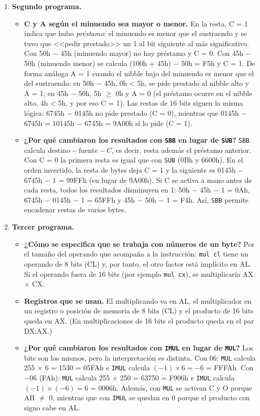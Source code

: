 \documentclass[10pt]{article}
\begin{document}
\begin{enumerate}
  \item \textbf{Segundo programa.}
  \begin{itemize}
    \item \textbf{C y A según el minuendo sea mayor o menor.} En la resta, C = 1 indica que hubo \emph{préstamo}: el minuendo es menor que el sustraendo y se tuvo que <<pedir prestado>> un 1 al bit siguiente al más significativo. Con 50h $-$ 45h (minuendo mayor) no hay préstamo y C = 0. Con 45h $-$ 50h (minuendo menor) se calcula (100h + 45h) $-$ 50h = F5h y C = 1. De forma análoga A = 1 cuando el nibble bajo del minuendo es menor que el del sustraendo: en 50h $-$ 45h, 0h < 5h, se pide prestado al nibble alto y A = 1; en 45h $-$ 50h, 5h $\geq$ 0h y A = 0 (el préstamo ocurre en el nibble alto, 4h < 5h, y por eso C = 1). Las restas de 16 bits siguen la misma lógica: 6745h $-$ 0145h no pide prestado (C = 0), mientras que 0145h $-$ 6745h = 10145h $-$ 6745h = 9A00h sí lo pide (C = 1).
    \item \textbf{¿Por qué cambiaron los resultados con \texttt{SBB} en lugar de \texttt{SUB}?} \texttt{SBB} calcula $\text{destino} - \text{fuente} - C$, es decir, resta además el préstamo anterior. Con C = 0 la primera resta es igual que con \texttt{SUB} (0Bh y 6600h). En el orden invertido, la resta de bytes deja C = 1 y la siguiente es 0145h $-$ 6745h $-$ 1 = 99FFh (en lugar de 9A00h). Si C se activa a mano antes de cada resta, todos los resultados disminuyen en 1: 50h $-$ 45h $-$ 1 = 0Ah, 6745h $-$ 0145h $-$ 1 = 65FFh y 45h $-$ 50h $-$ 1 = F4h. Así, \texttt{SBB} permite encadenar restas de varios bytes.
  \end{itemize}
 
  \item \textbf{Tercer programa.}
  \begin{itemize}
    \item \textbf{¿Cómo se especifica que se trabaja con números de un byte?} Por el tamaño del operando que acompaña a la instrucción: \texttt{mul cl} tiene un operando de 8 bits (CL) y, por tanto, el otro factor está implícito en AL. Si el operando fuera de 16 bits (por ejemplo \texttt{mul cx}), se multiplicaría AX $\times$ CX.
    \item \textbf{Registros que se usan.} El multiplicando va en AL, el multiplicador en un registro o posición de memoria de 8 bits (CL) y el producto de 16 bits queda en AX. (En multiplicaciones de 16 bits el producto queda en el par DX:AX.)
    \item \textbf{¿Por qué cambiaron los resultados con \texttt{IMUL} en lugar de \texttt{MUL}?} Los bits son los mismos, pero la interpretación es distinta. Con 06: \texttt{MUL} calcula 255 $\times$ 6 = 1530 = 05FAh e \texttt{IMUL} calcula $(-1) \times 6 = -6$ = FFFAh. Con $-06$ (FAh): \texttt{MUL} calcula 255 $\times$ 250 = 63750 = F906h e \texttt{IMUL} calcula $(-1) \times (-6) = 6$ = 0006h. Además, con \texttt{MUL} se activan C y O porque AH $\neq$ 0, mientras que con \texttt{IMUL} se quedan en 0 porque el producto con signo cabe en AL.
  \end{itemize}
 

\end{enumerate}
\end{document}
